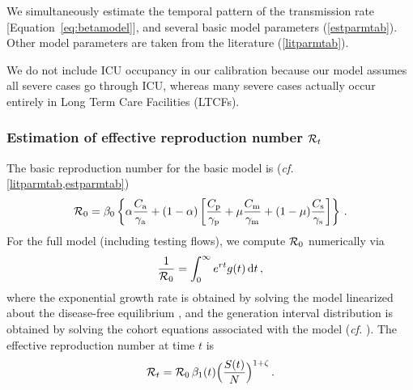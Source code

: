 \documentclass[12pt]{article}\usepackage[]{graphicx}\usepackage[]{color}
\begin{document}
We simultaneously estimate the temporal pattern of the transmission
rate [Equation~\eqref{eq:betamodel}], and several basic model
parameters (\cref{estparmtab}).  Other model parameters
are taken from the literature (\cref{litparmtab}).

We do not include ICU occupancy in our calibration because
our model assumes all severe cases go through ICU, whereas
many severe cases actually occur entirely in Long Term Care Facilities
(LTCFs).

\hypertarget{Rt}{}
\subsubsection*{Estimation of effective reproduction number ${\mathcal R}_t$}

The basic reproduction number for the basic model is (\emph{cf.}\/
\cref{litparmtab,estparmtab})  
\begin{equation}\label{eq:R0}
{\mathcal R}_0 = \beta_0 \left\{
\alpha \frac{C_{\rm a}}{\gamma_{\rm a}}
+
(1-\alpha)\left[ \frac{C_{\rm p}}{\gamma_{\rm p}}
  + \mu\frac{C_{\rm m}}{\gamma_{\rm m}}
  + (1-\mu)\frac{C_{\rm s}}{\gamma_{\rm s}} \right]
  \right\} \,.
\end{equation}
For the full model (including testing flows), we compute ${\mathcal R}_0$
numerically via \cite{WallLips07}
\begin{equation}
\frac{1}{{\mathcal R}_0} = \int_0^\infty e^{rt} g(t)\,{\rm d}t \,,
\end{equation}
where the exponential growth rate is obtained by solving the model
linearized about the disease-free equilibrium \cite{Ma+14}, and the
generation interval distribution is obtained by solving the cohort
equations associated with the model (\emph{cf.}\/
\cite{Cham+18}).
The effective reproduction number at time $t$ is
\begin{equation}\label{eq:Rt}
{\mathcal R}_t = {\mathcal R}_0\, \beta_1(t) \Big(\frac{S(t)}{N}\Big)^{1+\zeta}\,.
\end{equation}
\end{document}
